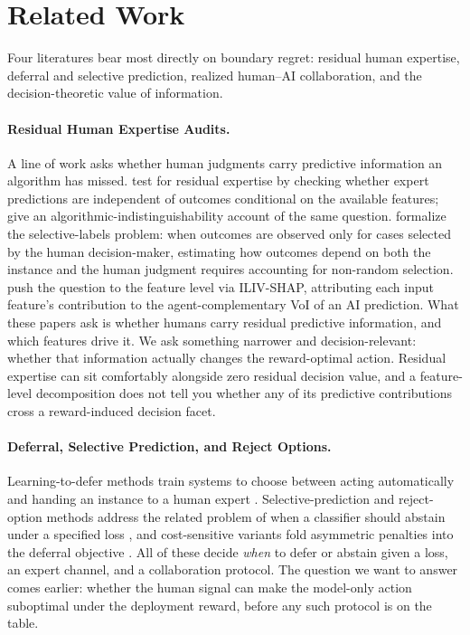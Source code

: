 \section{Related Work}
\label{sec:related}

Four literatures bear most directly on boundary regret: residual human expertise, deferral and selective prediction, realized human--AI collaboration, and the decision-theoretic value of information.

\paragraph{Residual Human Expertise Audits.}
A line of work asks whether human judgments carry predictive information an algorithm has missed.
\citet{AlurEtAl2023} test for residual expertise by checking whether expert predictions are independent of outcomes conditional on the available features; \citet{AlurRaghavanShah2024} give an algorithmic-indistinguishability account of the same question.
\citet{KleinbergEtAl2018} formalize the selective-labels problem: when outcomes are observed only for cases selected by the human decision-maker, estimating how outcomes depend on both the instance and the human judgment requires accounting for non-random selection.
\citet{GuoEtAl2025} push the question to the feature level via ILIV-SHAP, attributing each input feature's contribution to the agent-complementary VoI of an AI prediction.
What these papers ask is whether humans carry residual predictive information, and which features drive it. We ask something narrower and decision-relevant: whether that information actually changes the reward-optimal action. Residual expertise can sit comfortably alongside zero residual decision value, and a feature-level decomposition does not tell you whether any of its predictive contributions cross a reward-induced decision facet.

\paragraph{Deferral, Selective Prediction, and Reject Options.}
Learning-to-defer methods train systems to choose between acting automatically and handing an instance to a human expert \citep{MadraseEtAl2018,MozannarSontag2020,HemmerEtAl2023,MaoMohri2023}.
Selective-prediction and reject-option methods address the related problem of when a classifier should abstain under a specified loss \citep{RamaswamyEtAl2018,FrancPrusa2023}, and cost-sensitive variants fold asymmetric penalties into the deferral objective \citep{AlvesEtAl2024}.
All of these decide \emph{when} to defer or abstain given a loss, an expert channel, and a collaboration protocol. The question we want to answer comes earlier: whether the human signal can make the model-only action suboptimal under the deployment reward, before any such protocol is on the table.

